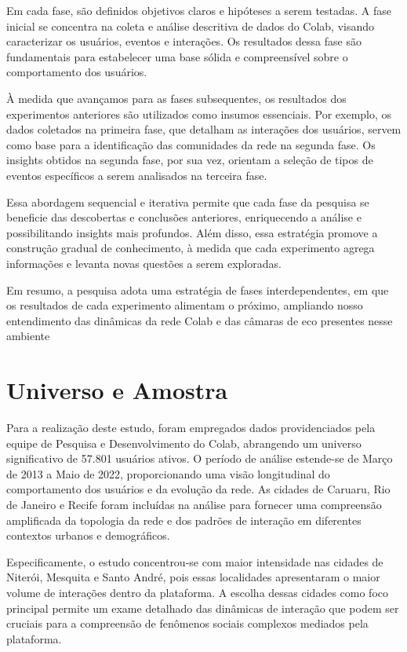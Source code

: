 Em cada fase, são definidos objetivos claros e hipóteses a serem testadas. A fase inicial se concentra na coleta e análise descritiva de dados do Colab, visando caracterizar os usuários, eventos e interações. Os resultados dessa fase são fundamentais para estabelecer uma base sólida e compreensível sobre o comportamento dos usuários.

À medida que avançamos para as fases subsequentes, os resultados dos experimentos anteriores são utilizados como insumos essenciais. Por exemplo, os dados coletados na primeira fase, que detalham as interações dos usuários, servem como base para a identificação das comunidades da rede na segunda fase. Os insights obtidos na segunda fase, por sua vez, orientam a seleção de tipos de eventos específicos a serem analisados na terceira fase.

Essa abordagem sequencial e iterativa permite que cada fase da pesquisa se beneficie das descobertas e conclusões anteriores, enriquecendo a análise e possibilitando insights mais profundos. Além disso, essa estratégia promove a construção gradual de conhecimento, à medida que cada experimento agrega informações e levanta novas questões a serem exploradas.

Em resumo, a pesquisa adota uma estratégia de fases interdependentes, em que os resultados de cada experimento alimentam o próximo, ampliando nosso entendimento das dinâmicas da rede Colab e das câmaras de eco presentes nesse ambiente

\section{Universo e Amostra}
Para a realização deste estudo, foram empregados dados providenciados pela equipe de Pesquisa e Desenvolvimento do Colab, abrangendo um universo significativo de 57.801 usuários ativos. O período de análise estende-se de Março de 2013 a Maio de 2022, proporcionando uma visão longitudinal do comportamento dos usuários e da evolução da rede. As cidades de Caruaru, Rio de Janeiro e Recife foram incluídas na análise para fornecer uma compreensão amplificada da topologia da rede e dos padrões de interação em diferentes contextos urbanos e demográficos.

Especificamente, o estudo concentrou-se com maior intensidade nas cidades de Niterói, Mesquita e Santo André, pois essas localidades apresentaram o maior volume de interações dentro da plataforma. A escolha dessas cidades como foco principal permite um exame detalhado das dinâmicas de interação que podem ser cruciais para a compreensão de fenômenos sociais complexos mediados pela plataforma.


